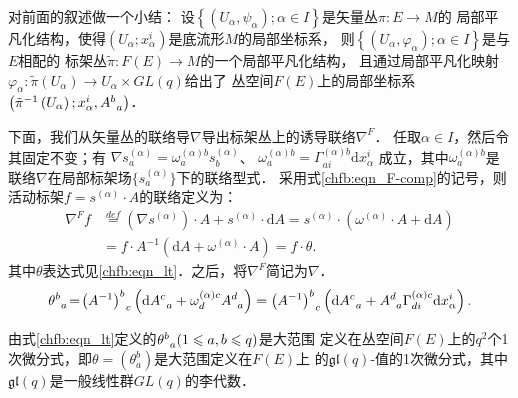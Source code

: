 对前面的叙述做一个小结：
设$\left\{\left(U_{\alpha}, \psi_{\alpha}\right) ; \alpha \in I\right\}$是矢量丛$\pi: E \rightarrow M$的
局部平凡化结构，使得$\left(U_{\alpha} ; x_{\alpha}^{i}\right)$是底流形$M$的局部坐标系，
则$\left\{\left(U_{\alpha}, \varphi_{\alpha}\right) ; \alpha \in I\right\}$是与$E$相配的
标架丛$\tilde{\pi}: F(E) \rightarrow M$的一个局部平凡化结构，
且通过局部平凡化映射$\varphi_{\alpha}: \tilde{\pi}\left(U_{\alpha}\right) \rightarrow U_{\alpha} \times GL(q)$给出了
丛空间$F(E)$上的局部坐标系$\left(\tilde{\pi}^{-1}\left(U_{\alpha}\right) ; x_{\alpha}^{i}, A_{\hphantom{a}a}^{b}\right)$．


下面，我们从矢量丛的联络导$\nabla$导出标架丛上的诱导联络$\nabla^F$．
任取$\alpha \in I$，然后令其固定不变；有 
$ \nabla s_{a}^{(\alpha)}=\omega_{a}^{(\alpha) b} s_{b}^{(\alpha)}$、 
$ \omega_{a}^{(\alpha) b}=\Gamma_{a i}^{(\alpha) b} \mathrm{d} x_{\alpha}^{i} $
成立，其中$\omega_{a}^{(\alpha) b}$是联络$\nabla$在局部标架场$\{s_{a}^{(\alpha)}\}$下的联络型式．
采用式\eqref{chfb:eqn_F-comp}的记号，则活动标架$f=s^{(\alpha)} \cdot A$的联络定义为： 
\begin{equation}\label{chfb:eqn_Frame-connection}
\begin{aligned}
    \nabla^F f & \overset{def}{=}\left(\nabla s^{(\alpha)}\right) \cdot A + s^{(\alpha)} \cdot \mathrm{d} A
    =s^{(\alpha)} \cdot \left(\omega^{(\alpha)} \cdot A+\mathrm{d} A\right)  \\
    & =f \cdot A^{-1}\left(\mathrm{d} A+\omega^{(\alpha)} \cdot A\right)
    =f \cdot \theta .    
\end{aligned}\end{equation}
其中$\theta$表达式见\eqref{chfb:eqn_lt}．之后，将$\nabla^F$简记为$\nabla$．
\begin{equation}\label{chfb:eqn_lt}
    \theta_{\hphantom{a}a}^{b}\! =\! \left(A^{-1}\right)_{\hphantom{a}c}^{b}
    \left(\mathrm{d} A_{\hphantom{a}a}^{c}+\omega_{d}^{(\alpha) c} A_{\hphantom{a}a}^{d} \right) 
    =\left(A^{-1}\right)_{\hphantom{a}c}^{b}\left(\mathrm{d} A_{\hphantom{a}a}^{c}+A_{\hphantom{a}a}^{d}
     \Gamma_{d i}^{(\alpha) c} \mathrm{d} x_{\alpha}^{i}\right) .
\end{equation}


\begin{theorem}\label{chfb:thm_ltg}
由式\eqref{chfb:eqn_lt}定义的$\theta_{\hphantom{a}a}^{b} (1 \leqslant a,b \leqslant q)$是大范围
定义在丛空间$F(E)$上的$q^{2}$个1次微分式，即$\theta=(\theta_{a}^{b})$是大范围定义在$F(E)$上
的$\mathfrak{g l}(q)$-值的1次微分式，其中$\mathfrak{gl}(q)$是一般线性群$GL(q)$的李代数．
\end{theorem}

